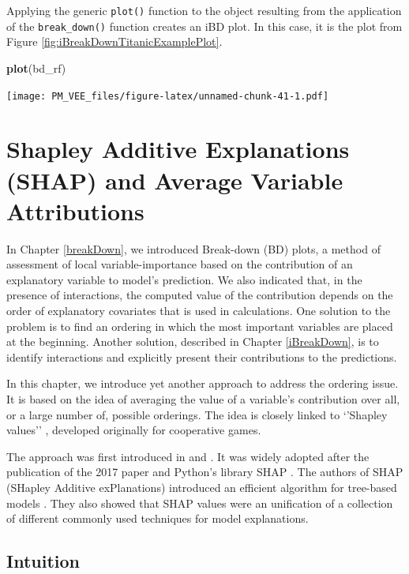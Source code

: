 \documentclass[12pt,]{krantz}
\newenvironment{Shaded}{\begin{snugshade}}{\end{snugshade}}
\newcommand{\KeywordTok}[1]{\textcolor[rgb]{0.13,0.29,0.53}{\textbf{#1}}}
\newcommand{\NormalTok}[1]{#1}
\begin{document}
Applying the generic \texttt{plot()} function to the object resulting from the application of the \texttt{break\_down()} function creates an iBD plot. In this case, it is the plot from Figure \ref{fig:iBreakDownTitanicExamplePlot}.

\begin{Shaded}
\begin{Highlighting}[]
\KeywordTok{plot}\NormalTok{(bd_rf) }
\end{Highlighting}
\end{Shaded}

\texttt{[image: PM\_VEE\_files/figure-latex/unnamed-chunk-41-1.pdf]}

\hypertarget{shapley}{%
\section{Shapley Additive Explanations (SHAP) and Average Variable Attributions}\label{shapley}}

In Chapter \ref{breakDown}, we introduced Break-down (BD) plots, a method of assessment of local variable-importance based on the contribution of an explanatory variable to model's prediction. We also indicated that, in the presence of interactions, the computed value of the contribution depends on the order of explanatory covariates that is used in calculations. One solution to the problem is to find an ordering in which the most important variables are placed at the beginning. Another solution, described in Chapter \ref{iBreakDown}, is to identify interactions and explicitly present their contributions to the predictions.

In this chapter, we introduce yet another approach to address the ordering issue. It is based on the idea of averaging the value of a variable's contribution over all, or a large number of, possible orderings. The idea is closely linked to `'Shapley values'' \citep{shapleybook1952}, developed originally for cooperative games.

The approach was first introduced in \citep{imeJLMR} and \citep{Strumbelj2014}. It was widely adopted after the publication of the 2017 paper \citep{SHAP} and Python's library SHAP \citep{shapPackage}. The authors of SHAP (SHapley Additive exPlanations) introduced an efficient algorithm for tree-based models \citep{TreeSHAP}. They also showed that SHAP values were an unification of a collection of different commonly used techniques for model explanations.

\hypertarget{SHAPIntuition}{%
\subsection{Intuition}\label{SHAPIntuition}}
\end{document}
